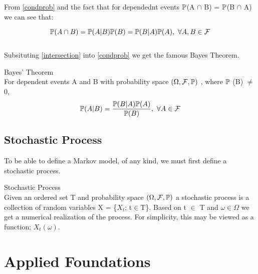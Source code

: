 From \ref{condprob} and the fact that for dependednt events $\mathbb{P}$(A $\cap$ B) = $\mathbb{P}$(B $\cap$ A) we can see that:

\begin{equation}
\label{intersection}
	\mathbb{P} (A \cap B) = \mathbb{P} (A|B) \mathbb{P} (B) = \mathbb{P} (B|A) \mathbb{P} (A), \  \forall A,B \in \mathcal{F}
\end{equation}
\\

Subsituting \ref{intersection} into \ref{condprob} we get the famous Bayes Theorem. 

\begin{theorem}
\label{bayes}
	Bayes’ Theorem \\
	For dependent events A and B with probability space $(\Omega ,\mathcal{F} , \mathbb{P})$ , where $\mathbb{P}$			(B) $\ne$ 0,
	\begin{equation}
		\mathbb{P} (A|B) = \dfrac{\mathbb{P} (B|A) \mathbb{P} (A)}{\mathbb{P} (B)}, \  \forall A \in \mathcal{F}
	\end{equation}
\end{theorem}



\subsection{Stochastic Process}
To be able to define a Markov model, of any kind, we must first define a stochastic process. 
\begin{definition}
\label{stochasticp} 
	Stochastic Process \\
	Given an ordered set T and probability space $(\Omega ,\mathcal{F} , \mathbb{P})$ a stochastic process is 		a collection of random variables X = \{$X_t$; t$\in$T\}. Based on t $\in $ T and $\omega \in \Omega$ 		we get a numerical realization of the process.  For simplicity, this may be viewed as a function; 			$X_t( \omega)$.

\end{definition}




\section{Applied Foundations}
